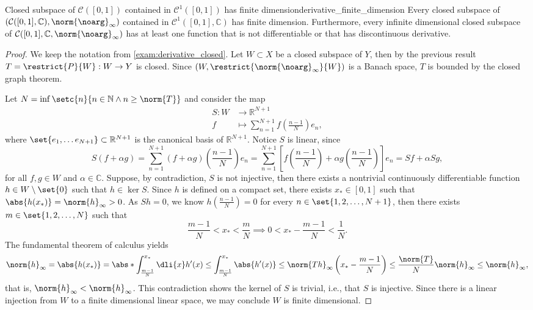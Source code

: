 \begin{proposition}{Closed subspace of \(\mathcal{C}([0,1])\) contained in \(\mathcal{C}^1([0,1])\) has finite dimension}{derivative_finite_dimension}
    Every closed subspace of \((\mathcal{C}([0,1], \mathbb{C}), \norm{\noarg}_\infty)\) contained in \(\mathcal{C}^1([0,1], \mathbb{C})\) has finite dimension. Furthermore, every infinite dimensional closed subspace of \(\mathcal{C}([0,1], \mathbb{C}, \norm{\noarg}_{\infty})\) has at least one function that is not differentiable or that has discontinuous derivative.
\end{proposition}
\begin{proof}
    We keep the notation from \cref{exam:derivative_closed}. Let \(W \subset X\) be a closed subspace of \(Y\), then by the previous result \(T = \restrict{P}{W} : W \to Y\) is closed. Since \((W, \restrict{\norm{\noarg}_\infty}{W})\) is a Banach space, \(T\) is bounded by the closed graph theorem.

    Let \(N = \inf\setc{n}{n \in \mathbb{N} \land n \geq \norm{T}}\) and consider the map
    \begin{align*}
        S : W &\to \mathbb{R}^{N + 1}\\
            f &\mapsto \sum_{n = 1}^{N+1} f\left(\frac{n-1}{N}\right) e_n,
    \end{align*}
    where \(\set{e_1, \dots e_{N+1}} \subset \mathbb{R}^{N+1}\) is the canonical basis of \(\mathbb{R}^{N+1}\). Notice \(S\) is linear, since
    \begin{equation*}
        S(f + \alpha g) = \sum_{n=1}^{N+1}(f + \alpha g)\left(\frac{n-1}{N}\right) e_n = \sum_{n=1}^{N+1} \left[f\left(\frac{n-1}{N}\right) + \alpha g\left(\frac{n-1}{N}\right)\right] e_n = Sf + \alpha Sg,
    \end{equation*}
    for all \(f, g \in W\) and \(\alpha \in \mathbb{C}\). Suppose, by contradiction, \(S\) is not injective, then there exists a nontrivial continuously differentiable function \(h \in W\setminus \set{0}\) such that \(h \in \ker{S}\). Since \(h\) is defined on a compact set, there exists \(x_* \in [0,1]\) such that \(\abs{h(x_*)} = \norm{h}_\infty > 0\). As \(Sh = 0\), we know \(h\left(\frac{n - 1}{N}\right) = 0\) for every \(n \in \set{1,2, \dots, N+1}\), then there exists \(m \in \set{1,2,\dots, N}\) such that
    \begin{equation*}
        \frac{m-1}{N} < x_* < \frac{m}{N} \implies 0 < x_* - \frac{m - 1}{N} < \frac{1}{N}.
    \end{equation*}
    The fundamental theorem of calculus yields
    \begin{equation*}
        \norm{h}_{\infty} = \abs{h(x_*)} = \abs*{\int_{\frac{m - 1}{N}}^{x_*} \dli{x} h'(x)} \leq \int_{\frac{m-1}{N}}^{x_*} \abs{h'(x)} \leq \norm{Th}_{\infty} \left(x_* - \frac{m-1}{N}\right) \leq \frac{\norm{T}}{N}\norm{h}_{\infty} \leq \norm{h}_\infty,
    \end{equation*}
    that is, \(\norm{h}_\infty < \norm{h}_\infty\). This contradiction shows the kernel of \(S\) is trivial, i.e., that \(S\) is injective. Since there is a linear injection from \(W\) to a finite dimensional linear space, we may conclude \(W\) is finite dimensional.


\end{proof}
